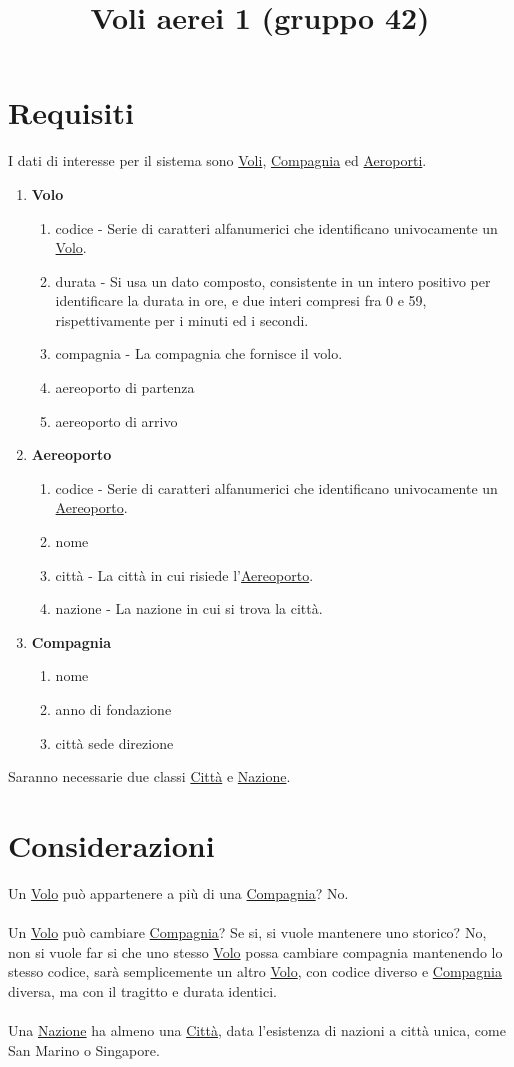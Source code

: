 \documentclass[12pt, letterpaper]{article}
\title{Voli aerei 1 (gruppo 42)}
\date{}
\newcommand{\acc}{\\\hphantom{}\\}
\begin{document}
\maketitle


\section{Requisiti}

I dati di interesse per il sistema sono \underline{Voli}, \underline{Compagnia} ed \underline{Aeroporti}.
\begin{enumerate}
    \item \textbf{Volo}\begin{enumerate}
        \item codice - Serie di caratteri alfanumerici che identificano univocamente un \underline{Volo}.
        \item durata - Si usa un dato composto, consistente in un intero positivo per identificare la durata in ore, e due interi 
        compresi fra 0 e 59, rispettivamente per i minuti ed i secondi.
        \item compagnia - La compagnia che fornisce il volo.
        \item aereoporto di partenza 
        \item aereoporto di arrivo
    \end{enumerate}
    \item \textbf{Aereoporto}\begin{enumerate}
        \item codice - Serie di caratteri alfanumerici che identificano univocamente un \underline{Aereoporto}.
        \item nome 
        \item città - La città in cui risiede l'\underline{Aereoporto}.
        \item nazione - La nazione in cui si trova la città.
    \end{enumerate}
    \item \textbf{Compagnia}\begin{enumerate}
        \item nome 
        \item anno di fondazione 
        \item città sede direzione
    \end{enumerate}
\end{enumerate}
Saranno necessarie due classi \underline{Città} e \underline{Nazione}.\newpage
\section{Considerazioni}
Un \underline{Volo} può appartenere a più di una \underline{Compagnia}? No.\acc 
Un \underline{Volo} può cambiare \underline{Compagnia}? Se si, si vuole mantenere uno storico? No, non si vuole far si che uno stesso 
\underline{Volo} possa cambiare compagnia mantenendo lo stesso codice, sarà semplicemente un altro  \underline{Volo}, con codice 
diverso e \underline{Compagnia} diversa, ma con il tragitto e durata identici.\acc
Una \underline{Nazione} ha almeno una \underline{Città}, data l'esistenza di nazioni a città unica, come San Marino o Singapore.
\end{document}

